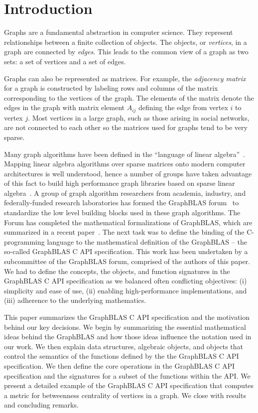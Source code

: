 \section{Introduction}
\label{sec:intro}

Graphs are a fundamental abstraction in computer science.  They represent
relationships between a finite collection of objects.   The objects, or
\emph{vertices}, in a graph are connected by \emph{edges}.  This leads
to the common view of a graph as two sets: a set of vertices and a set
of edges.

Graphs can also be represented as matrices.   For example, the
\emph{adjacency matrix} for a graph is constructed by labeling rows and
columns of the matrix corresponding to the vertices of the graph.  The elements of
the matrix denote the edges in the graph with matrix element $A_{ij}$
defining the edge from vertex $i$ to vertex $j$.  Most
vertices in a large graph, such as those arising in social networks,
are not connected to each other so the matrices used for graphs tend to
be very sparse.

Many graph algorithms have been defined in the ``language of linear
algebra''~\cite{kepner2011graph}.  Mapping linear algebra algorithms over
sparse matrices onto modern computer architectures is well understood,
hence a number of groups have taken advantage of this fact to build high
performance graph libraries based on sparse linear algebra~\cite{combblas,
gadepally2015graphulo, gpi2016, sundaram2015graphmat}.  A group
of graph algorithm researchers from academia, industry, and
federally-funded research laboratories has formed the GraphBLAS
forum~\cite{graphblas_web} to standardize the low level building
blocks used in these graph algorithms.  The Forum has completed the
mathematical formalizations of GraphBLAS, which are summarized in a
recent paper~\cite{mathgraphblas16}.  The next task was to define the
binding of the C-programming language to the mathematical definition of
the GraphBLAS -- the so-called GraphBLAS C API specification.   This work
has been undertaken by a subcommittee of the GraphBLAS forum, comprised of
the authors of this paper.  We had to define the concepts, the objects,
and function signatures in the GraphBLAS C API specification as we
balanced often conflicting objectives: (i) simplicity and ease of use,
(ii) enabling high-performance implementations, and (iii) adherence to
the underlying mathematics.

This paper summarizes the GraphBLAS C API specification and the
motivation behind our key decisions.  We begin by summarizing the
essential mathematical ideas behind the GraphBLAS and how those ideas
influence the notation used in our work.  We then explain data structures,
algebraic objects, and objects that control the semantics of the functions
defined by the the GraphBLAS C API specification.   We then define the
core operations in the GraphBLAS C API specification and the signatures
for a subset of the functions  within the API.  We present a detailed
example of the GraphBLAS C API specification that computes a metric for
betweenness centrality of vertices in a graph.  We close with results
and concluding remarks.
